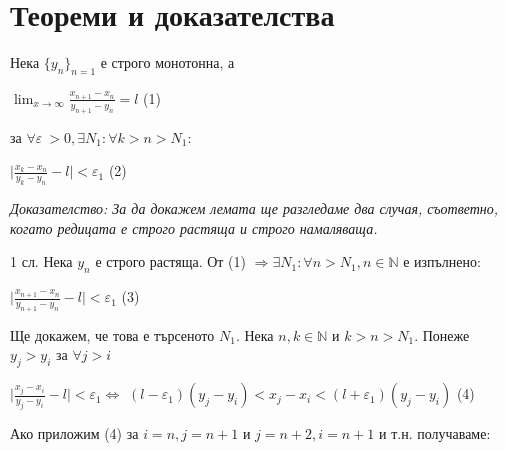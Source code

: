 \documentclass[12pt]{article}
\begin{document}
\section{Теореми и доказателства}
\begin{lemma1}
Нека \(\{y_n\}_{n=1}\) е строго монотонна, а
\begin{center}
\(\displaystyle\lim_{x \to \infty} \frac{x_{n+1} - x_n}{y_{n+1} - y_n} = l\) (1)
\end{center}
за \(\forall \varepsilon\ > 0, \exists N_1: \forall k > n > N_1:\)
\begin{center}
\(\displaystyle\lvert\frac{x_k - x_n}{y_k - y_n} - l\rvert < \varepsilon_1\) (2)
\newline
\end{center}
\it{Доказателство:} За да докажем лемата ще разгледаме два случая, съответно, когато редицата е строго растяща и строго намаляваща.

1 сл. Нека \({y_n}\) е строго растяща. От (1) \(\Rightarrow \exists N_1 : \forall n > N_1, n \in \mathbb N \) е изпълнено:

\begin{center}
\(\displaystyle\lvert\frac{x_{n+1} - x_n}{y_{n+1} - y_n} - l\rvert < \varepsilon_1\) (3)
\end{center}

Ще докажем, че това е търсеното \(N_1\). Нека \(n, k \in \mathbb N\) и \(k > n > N_1\).
Понеже \(y_j > y_i\) за \(\forall j > i\)

\begin{center}
\(\displaystyle\lvert\frac{x_j - x_i}{y_j - y_i} - l\rvert < \varepsilon_1 \Leftrightarrow\) 
\((l - \varepsilon_1)(y_j - y_i) < x_j - x_i < (l + \varepsilon_1)(y_j - y_i)\) (4)
\end{center}
Ако приложим (4) за \(i = n, j = n + 1\) и \(j = n + 2, i = n + 1\) и т.н. получаваме:


\end{lemma1}
\end{document}
